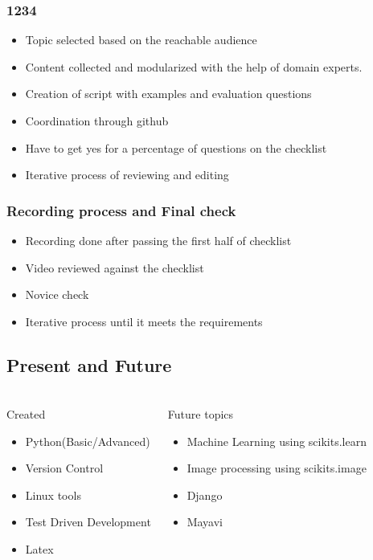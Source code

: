 \documentclass[compress,red]{beamer} %
\begin{document}
\begin{frame}
\frametitle{1234}
\begin{itemize}
\item Topic selected based on the reachable audience
\item Content collected and modularized with the help of domain experts.
\item Creation of script with examples and evaluation questions
\item Coordination through github
\item Have to get yes for a percentage of questions on the checklist
\item Iterative process of reviewing and editing
\end{itemize}
\end{frame}

\begin{frame}
\frametitle{Recording process and Final check}
\begin{itemize}
\item Recording done after passing the first half of checklist
\item Video reviewed against the checklist
\item Novice check
\item Iterative process until it meets the requirements
\end{itemize}
\end{frame}

\subsection{Present and Future}
\begin{frame}
\frametitle{}
\begin{columns}
\begin{block}{Created}
\begin{itemize}
\item Python(Basic/Advanced)
\item Version Control
\item Linux tools
\item Test Driven Development
\item Latex
\end{itemize}
\end{block}
\begin{block}{Future topics}
\begin{itemize}
\item Machine Learning using scikits.learn
\item Image processing using scikits.image
\item Django
\item Mayavi
\end{itemize}
\end{block}
\end{columns}
\end{frame}
\end{document}
